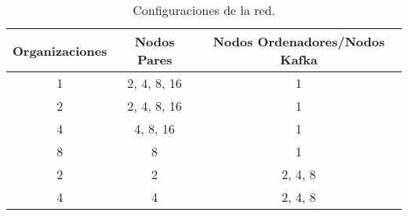 \begin{anexos}
    
\begin{table}[h]
\begin{center}
\begin{tabular}{| c | c | c |}
\hline
Organizaciones & Nodos Pares & Nodos Ordenadores/Nodos Kafka \\ \hline
1 & 2, 4, 8, 16 & 1 \\ \hline
2 & 2, 4, 8, 16 & 1 \\ \hline
4 & 4, 8, 16 & 1 \\ \hline
8 & 8 & 1 \\ \hline
2 & 2 & 2, 4, 8 \\ \hline
4 & 4 & 2, 4, 8 \\ \hline
\end{tabular}
\caption{Configuraciones de la red.}
\label{tab:Configuraciones}
\end{center}
\end{table}

\end{anexos}
